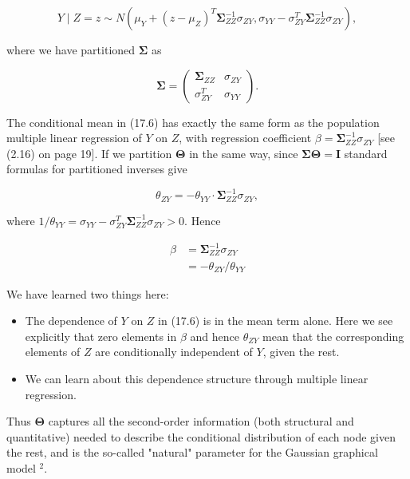 \documentclass[10pt]{article}
\begin{document}
\begin{equation*}
Y \mid Z=z \sim N\left(\mu_{Y}+\left(z-\mu_{Z}\right)^{T} \boldsymbol{\Sigma}_{Z Z}^{-1} \sigma_{Z Y}, \sigma_{Y Y}-\sigma_{Z Y}^{T} \boldsymbol{\Sigma}_{Z Z}^{-1} \sigma_{Z Y}\right), \tag{17.6}
\end{equation*}


where we have partitioned $\boldsymbol{\Sigma}$ as

\[
\boldsymbol{\Sigma}=\left(\begin{array}{cc}
\boldsymbol{\Sigma}_{Z Z} & \sigma_{Z Y}  \tag{17.7}\\
\sigma_{Z Y}^{T} & \sigma_{Y Y}
\end{array}\right) .
\]

The conditional mean in (17.6) has exactly the same form as the population multiple linear regression of $Y$ on $Z$, with regression coefficient $\beta=\boldsymbol{\Sigma}_{Z Z}^{-1} \sigma_{Z Y}$ [see (2.16) on page 19]. If we partition $\boldsymbol{\Theta}$ in the same way, since $\boldsymbol{\Sigma} \boldsymbol{\Theta}=\mathbf{I}$ standard formulas for partitioned inverses give


\begin{equation*}
\theta_{Z Y}=-\theta_{Y Y} \cdot \boldsymbol{\Sigma}_{Z Z}^{-1} \sigma_{Z Y}, \tag{17.8}
\end{equation*}


where $1 / \theta_{Y Y}=\sigma_{Y Y}-\sigma_{Z Y}^{T} \boldsymbol{\Sigma}_{Z Z}^{-1} \sigma_{Z Y}>0$. Hence


\begin{align*}
\beta & =\boldsymbol{\Sigma}_{Z Z}^{-1} \sigma_{Z Y}  \tag{17.9}\\
& =-\theta_{Z Y} / \theta_{Y Y}
\end{align*}


We have learned two things here:

\begin{itemize}
  \item The dependence of $Y$ on $Z$ in (17.6) is in the mean term alone. Here we see explicitly that zero elements in $\beta$ and hence $\theta_{Z Y}$ mean that the corresponding elements of $Z$ are conditionally independent of $Y$, given the rest.
  \item We can learn about this dependence structure through multiple linear regression.
\end{itemize}

Thus $\boldsymbol{\Theta}$ captures all the second-order information (both structural and quantitative) needed to describe the conditional distribution of each node given the rest, and is the so-called "natural" parameter for the Gaussian graphical model ${ }^{2}$.
\end{document}
